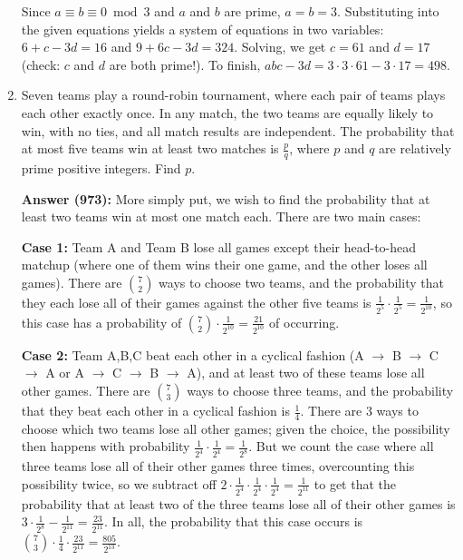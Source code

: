 \documentclass{article}
\begin{document}
\begin{enumerate}
Since $a \equiv b \equiv 0 \bmod 3$ and $a$ and $b$ are prime, $a = b = 3$. Substituting into the given equations yields a system of equations in two variables: $6+c-3d=16$ and $9+6c-3d=324$. Solving, we get $c = 61$ and $d = 17$ (check: $c$ and $d$ are both prime!). To finish, $abc-3d = 3 \cdot 3 \cdot 61 - 3 \cdot 17 = \boxed{498}$.

\item Seven teams play a round-robin tournament, where each pair of teams plays each other exactly once. In any match, the two teams are equally likely to win, with no ties, and all match results are independent. The probability that at most five teams win at least two matches is $\frac{p}{q}$, where $p$ and $q$ are relatively prime positive integers. Find $p$.

\textbf{Answer (973):} More simply put, we wish to find the probability that at least two teams win at most one match each. There are two main cases:

\textbf{Case 1:} Team A and Team B lose all games except their head-to-head matchup (where one of them wins their one game, and the other loses all games). There are $\binom{7}{2}$ ways to choose two teams, and the probability that they each lose all of their games against the other five teams is $\frac{1}{2^5} \cdot \frac{1}{2^5} = \frac{1}{2^{10}}$, so this case has a probability of $\binom{7}{2} \cdot \frac{1}{2^{10}} = \frac{21}{2^{10}}$ of occurring.

\textbf{Case 2:} Team A,B,C beat each other in a cyclical fashion (A $\rightarrow$ B $\rightarrow$ C $\rightarrow$ A or A $\rightarrow$ C $\rightarrow$ B $\rightarrow$ A), and at least two of these teams lose all other games. There are $\binom{7}{3}$ ways to choose three teams, and the probability that they beat each other in a cyclical fashion is $\frac{1}{4}$. There are 3 ways to choose which two teams lose all other games; given the choice, the possibility then happens with probability $\frac{1}{2^4} \cdot \frac{1}{2^4} = \frac{1}{2^8}$. But we count the case where all three teams lose all of their other games three times, overcounting this possibility twice, so we subtract off $2 \cdot \frac{1}{2^4} \cdot \frac{1}{2^4} \cdot \frac{1}{2^4} = \frac{1}{2^{11}}$ to get that the probability that at least two of the three teams lose all of their other games is $3 \cdot \frac{1}{2^8}-\frac{1}{2^{11}} = \frac{23}{2^{11}}$. In all, the probability that this case occurs is $\binom{7}{3} \cdot \frac{1}{4} \cdot \frac{23}{2^{11}} = \frac{805}{2^{13}}$.


\end{enumerate}
\end{document}
